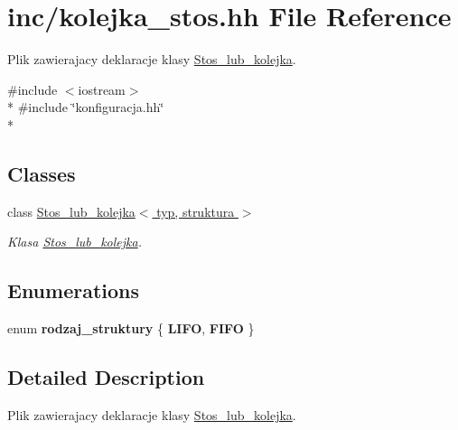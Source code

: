 \hypertarget{kolejka__stos_8hh}{\section{inc/kolejka\+\_\+stos.hh File Reference}
\label{kolejka__stos_8hh}
}


Plik zawierajacy deklaracje klasy \hyperlink{class_stos__lub__kolejka}{Stos\+\_\+lub\+\_\+kolejka}.  


{\ttfamily \#include $<$iostream$>$}\\*
{\ttfamily \#include \char`\"{}konfiguracja.\+hh\char`\"{}}\\*
\subsection*{Classes}
\begin{DoxyCompactItemize}
\item 
class \hyperlink{class_stos__lub__kolejka}{Stos\+\_\+lub\+\_\+kolejka$<$ typ, struktura $>$}
\begin{DoxyCompactList}\small\item\em Klasa \hyperlink{class_stos__lub__kolejka}{Stos\+\_\+lub\+\_\+kolejka}. \end{DoxyCompactList}\end{DoxyCompactItemize}
\subsection*{Enumerations}
\begin{DoxyCompactItemize}
\item 
\hypertarget{kolejka__stos_8hh_ac4ee52880299a21ae4131d3532bb1609}{enum {\bfseries rodzaj\+\_\+struktury} \{ {\bfseries L\+I\+F\+O}, 
{\bfseries F\+I\+F\+O}
 \}}\label{kolejka__stos_8hh_ac4ee52880299a21ae4131d3532bb1609}

\end{DoxyCompactItemize}


\subsection{Detailed Description}
Plik zawierajacy deklaracje klasy \hyperlink{class_stos__lub__kolejka}{Stos\+\_\+lub\+\_\+kolejka}. 

